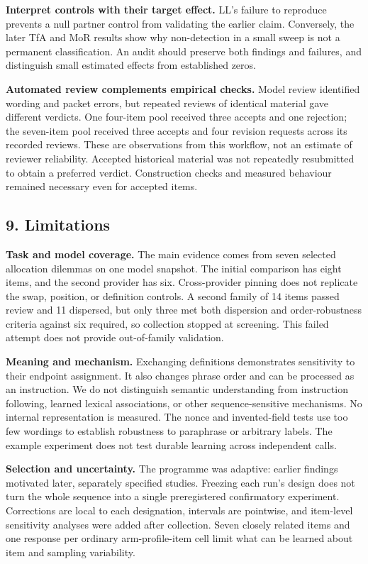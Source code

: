 \documentclass[
  11pt]{article}
\begin{document}
\textbf{Interpret controls with their target effect.} LL's failure to
reproduce prevents a null partner control from validating the earlier
claim. Conversely, the later TfA and MoR results show why non-detection
in a small sweep is not a permanent classification. An audit should
preserve both findings and failures, and distinguish small estimated
effects from established zeros.

\textbf{Automated review complements empirical checks.} Model review
identified wording and packet errors, but repeated reviews of identical
material gave different verdicts. One four-item pool received three
accepts and one rejection; the seven-item pool received three accepts
and four revision requests across its recorded reviews. These are
observations from this workflow, not an estimate of reviewer
reliability. Accepted historical material was not repeatedly resubmitted
to obtain a preferred verdict. Construction checks and measured
behaviour remained necessary even for accepted items.

\subsection{9. Limitations}\label{limitations}

\textbf{Task and model coverage.} The main evidence comes from seven
selected allocation dilemmas on one model snapshot. The initial
comparison has eight items, and the second provider has six.
Cross-provider pinning does not replicate the swap, position, or
definition controls. A second family of 14 items passed review and 11
dispersed, but only three met both dispersion and order-robustness
criteria against six required, so collection stopped at screening. This
failed attempt does not provide out-of-family validation.

\textbf{Meaning and mechanism.} Exchanging definitions demonstrates
sensitivity to their endpoint assignment. It also changes phrase order
and can be processed as an instruction. We do not distinguish semantic
understanding from instruction following, learned lexical associations,
or other sequence-sensitive mechanisms. No internal representation is
measured. The nonce and invented-field tests use too few wordings to
establish robustness to paraphrase or arbitrary labels. The example
experiment does not test durable learning across independent calls.

\textbf{Selection and uncertainty.} The programme was adaptive: earlier
findings motivated later, separately specified studies. Freezing each
run's design does not turn the whole sequence into a single
preregistered confirmatory experiment. Corrections are local to each
designation, intervals are pointwise, and item-level sensitivity
analyses were added after collection. Seven closely related items and
one response per ordinary arm-profile-item cell limit what can be
learned about item and sampling variability.
\end{document}
